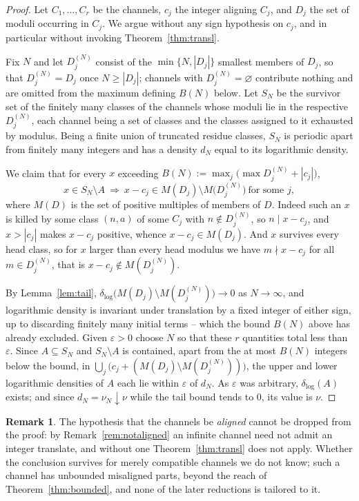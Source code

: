 \documentclass[11pt]{article}
\theoremstyle{plain}
\theoremstyle{definition}
\newtheorem{remark}[theorem]{Remark}
\newcommand{\dlog}{\delta_{\log}}
\begin{document}
\begin{proof}
Let $C_1,\dots,C_r$ be the channels, $c_j$ the integer aligning
$C_j$, and $D_j$ the set of moduli occurring in $C_j$.  We argue
without any sign hypothesis on $c_j$, and in particular without
invoking Theorem~\ref{thm:transl}.

Fix $N$ and let $D_j^{(N)}$ consist of the
$\min\{N,|D_j|\}$ smallest members of $D_j$, so that
$D_j^{(N)}=D_j$ once $N\ge|D_j|$; channels with
$D_j^{(N)}=\varnothing$ contribute nothing and are omitted from
the maximum defining $B(N)$ below.  Let $S_N$ be the survivor
set of the finitely many classes of the channels whose moduli
lie in the respective $D_j^{(N)}$, each channel being a set of
classes and the classes assigned to it exhausted by modulus.  Being a finite union
of truncated residue classes, $S_N$ is periodic apart from
finitely many integers and has a density $d_N$
equal to its logarithmic density.

We claim that for every $x$ exceeding
$B(N):=\max_j\bigl(\max D_j^{(N)}+|c_j|\bigr)$,
\[
  x\in S_N\setminus A
  \ \Longrightarrow\
  x-c_j\in M(D_j)\setminus M\bigl(D_j^{(N)}\bigr)
  \ \text{for some } j,
\]
where $M(D)$ is the set of positive multiples of members of $D$.
Indeed such an $x$ is killed by some class $(n,a)$ of some $C_j$
with $n\notin D_j^{(N)}$, so $n\mid x-c_j$, and $x>|c_j|$ makes
$x-c_j$ positive, whence $x-c_j\in M(D_j)$.  And $x$ survives
every head class, so for $x$ larger than every head modulus we
have $m\nmid x-c_j$ for all $m\in D_j^{(N)}$, that is
$x-c_j\notin M(D_j^{(N)})$.

By Lemma~\ref{lem:tail},
$\dlog\bigl(M(D_j)\setminus M(D_j^{(N)})\bigr)\to0$ as
$N\to\infty$, and logarithmic density is invariant under
translation by a fixed integer of either sign, up to discarding
finitely many initial terms -- which the bound $B(N)$ above has
already excluded.  Given
$\varepsilon>0$ choose $N$ so that these $r$ quantities total
less than $\varepsilon$.  Since $A\subseteq S_N$ and
$S_N\setminus A$ is contained, apart from the at most $B(N)$
integers below the bound, in
$\bigcup_j\bigl(c_j+(M(D_j)\setminus M(D_j^{(N)}))\bigr)$, the
upper and lower logarithmic densities of $A$ each lie within
$\varepsilon$ of $d_N$.  As $\varepsilon$ was arbitrary,
$\dlog(A)$ exists; and since $d_N=\nu_N\downarrow\nu$ while the
tail bound tends to $0$, its value is $\nu$.
\end{proof}

\begin{remark}
The hypothesis that the channels be \emph{aligned} cannot be
dropped from the proof: by Remark~\ref{rem:notaligned} an
infinite channel need not admit an integer translate, and
without one Theorem~\ref{thm:transl} does not apply.  Whether
the conclusion survives for merely compatible channels we do not
know; such a channel has unbounded misaligned parts, beyond
the reach of Theorem~\ref{thm:bounded}, and none of the later
reductions is tailored to it.
\end{remark}
\end{document}
